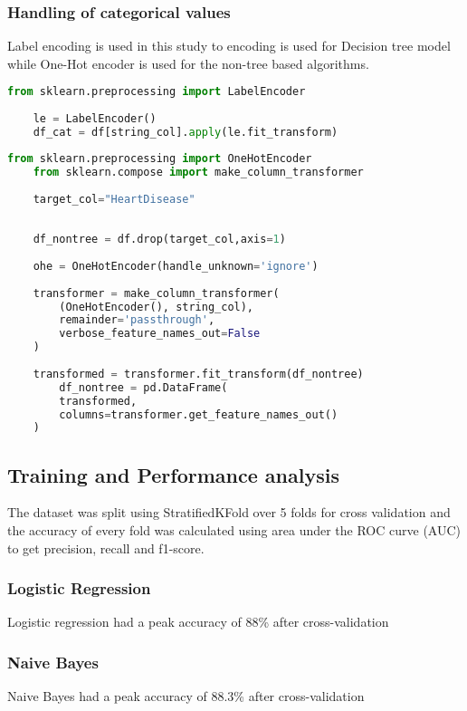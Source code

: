 \subsubsection{Handling of categorical values}
Label encoding is used in this study to encoding is used for Decision tree model while One-Hot encoder is used for the non-tree based algorithms.

\begin{lstlisting}[language=Python, caption={Applying Label Encoder to the dataframe}]
	from sklearn.preprocessing import LabelEncoder
	
	le = LabelEncoder()
	df_cat = df[string_col].apply(le.fit_transform)
\end{lstlisting}

\begin{lstlisting}[language=Python, caption={Applying One-Hot Encoder to the dataframe}]
	from sklearn.preprocessing import OneHotEncoder
	from sklearn.compose import make_column_transformer
	
	target_col="HeartDisease"
	
	
	df_nontree = df.drop(target_col,axis=1)
	
	ohe = OneHotEncoder(handle_unknown='ignore')
	
	transformer = make_column_transformer(
		(OneHotEncoder(), string_col),
		remainder='passthrough',
		verbose_feature_names_out=False
	)
	
	transformed = transformer.fit_transform(df_nontree)
		df_nontree = pd.DataFrame(
		transformed, 
		columns=transformer.get_feature_names_out()
	)
\end{lstlisting}

\subsection{Training and Performance analysis}
The dataset was split using StratifiedKFold over 5 folds for cross validation and the accuracy of every fold was calculated using area under the ROC curve (AUC) to get precision, recall and f1-score.


\subsubsection{Logistic Regression}
Logistic regression had a peak accuracy of 88\% after cross-validation

\subsubsection{Naive Bayes}
Naive Bayes had a peak accuracy of 88.3\% after cross-validation

